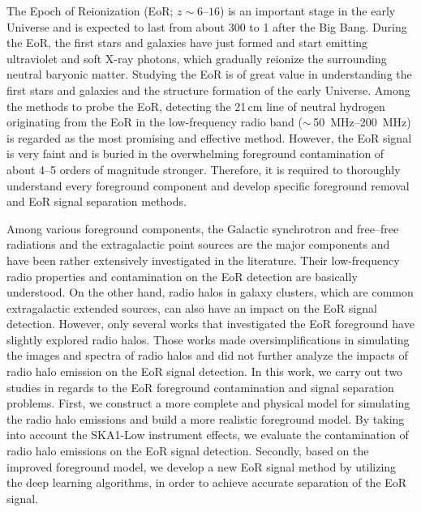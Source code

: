 \begin{englishabstract}

The Epoch of Reionization (EoR; $z \sim \numrange{6}{16}$) is
an important stage in the early Universe and is expected to last
from about \SI{300}{\Myr} to \SI{1}{\Gyr} after the Big Bang.
During the EoR, the first stars and galaxies have just formed and
start emitting ultraviolet and soft X-ray photons,
which gradually reionize the surrounding neutral baryonic matter.
Studying the EoR is of great value in understanding the first stars
and galaxies and the structure formation of  the early Universe.
Among the methods to probe the EoR, detecting the 21\,cm line of
neutral hydrogen originating from the EoR in the low-frequency
radio band ($\sim$\,\SIrange{50}{200}{\MHz}) is regarded as
the most promising and effective method.
However, the EoR signal is very faint and is buried in the overwhelming
foreground contamination of about 4--5 orders of magnitude stronger.
Therefore, it is required to thoroughly understand every foreground
component and develop specific foreground removal and EoR signal
separation methods.

Among various foreground components, the Galactic synchrotron and
free--free radiations and the extragalactic point sources are the
major components and have been rather extensively investigated in
the literature.
Their low-frequency radio properties and contamination on the EoR
detection are basically understood.
On the other hand, radio halos in galaxy clusters, which are common
extragalactic extended sources, can also have an impact on the EoR
signal detection.
However, only several works that investigated the EoR foreground
have slightly explored radio halos.
Those works made oversimplifications in simulating the images and
spectra of radio halos and did not further analyze the impacts of
radio halo emission on the EoR signal detection.
In this work, we carry out two studies in regards to the EoR
foreground contamination and signal separation problems.
First, we construct a more complete and physical model for simulating
the radio halo emissions and build a more realistic foreground model.
By taking into account the SKA1-Low instrument effects, we evaluate
the contamination of radio halo emissions on the EoR signal detection.
Secondly, based on the improved foreground model, we develop a new EoR
signal method by utilizing the deep learning algorithms, in order to
achieve accurate separation of the EoR signal.


\end{englishabstract}
